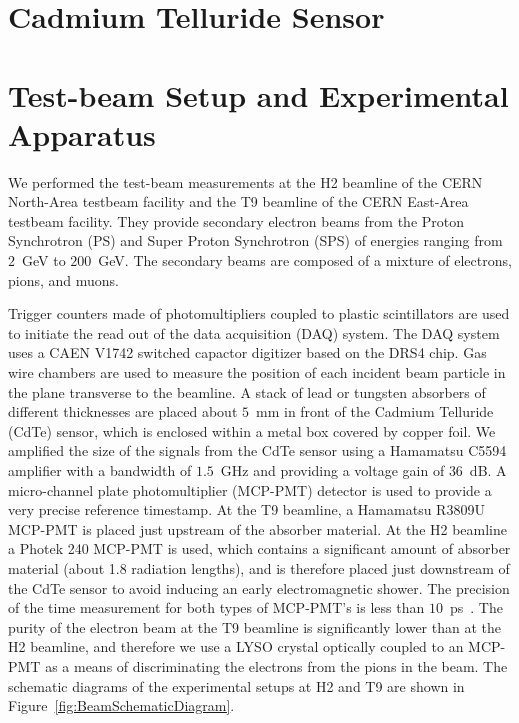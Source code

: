 \documentclass[preprint,1p]{elsarticle}
\begin{document}
 
\section{Cadmium Telluride Sensor}
\label{sec:siliconpad}


  
\section{Test-beam Setup and Experimental Apparatus }
\label{sec:tbeam}

We performed the test-beam measurements at the H2 beamline of the CERN North-Area testbeam facility
and the T9 beamline of the CERN East-Area testbeam facility. They provide secondary electron beams 
from the Proton Synchrotron (PS) and Super Proton Synchrotron (SPS)
of energies ranging from $2$~GeV to $200$~GeV. The secondary beams are composed of 
a mixture of electrons, pions, and muons. 

Trigger counters made of photomultipliers coupled to plastic scintillators are used 
to initiate the read out of the data acquisition (DAQ) system. The DAQ system
uses a CAEN V1742 switched capactor digitizer based on the DRS4 chip. Gas wire chambers
are used to measure the position of each incident beam particle in the plane transverse
to the beamline. A stack of lead or tungsten absorbers of different thicknesses are 
placed about $5$~mm in front of the Cadmium Telluride (CdTe) sensor, which is 
enclosed within a metal box covered by copper foil. We amplified the size of the
signals from the CdTe sensor using a Hamamatsu C5594 amplifier with a bandwidth of
$1.5$~GHz and providing a voltage gain of $36$~dB. A micro-channel plate photomultiplier (MCP-PMT)
detector is used to provide a very precise reference timestamp. At the T9 beamline,
a Hamamatsu R3809U MCP-PMT is placed just upstream of the absorber material. 
At the H2 beamline a Photek 240 MCP-PMT is used, which contains a significant 
amount of absorber material (about 1.8 radiation lengths), and is therefore placed 
just downstream of the CdTe sensor to avoid inducing an early electromagnetic shower.
The precision of the time measurement for both types of MCP-PMT's is less than 
$10$~ps~\cite{Ronzhin2015288}. The purity of the electron beam at the T9 beamline is
significantly lower than at the H2 beamline, and therefore we use a LYSO crystal
optically coupled to an MCP-PMT as a means of discriminating the electrons from the pions
in the beam. The schematic diagrams of the experimental setups at H2 and T9 
are shown in Figure~\ref{fig:BeamSchematicDiagram}. 
\end{document}
